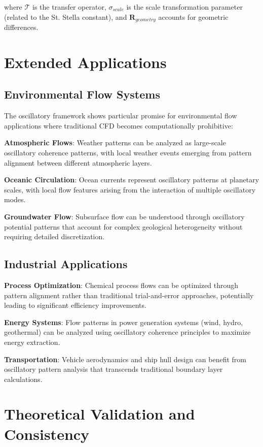 \documentclass[12pt,a4paper]{article}
\begin{document}
where $\mathcal{T}$ is the transfer operator, $\sigma_{scale}$ is the scale transformation parameter (related to the St. Stella constant), and $\mathbf{R}_{geometry}$ accounts for geometric differences.

\section{Extended Applications}

\subsection{Environmental Flow Systems}

The oscillatory framework shows particular promise for environmental flow applications where traditional CFD becomes computationally prohibitive:

\textbf{Atmospheric Flows}: Weather patterns can be analyzed as large-scale oscillatory coherence patterns, with local weather events emerging from pattern alignment between different atmospheric layers.

\textbf{Oceanic Circulation}: Ocean currents represent oscillatory patterns at planetary scales, with local flow features arising from the interaction of multiple oscillatory modes.

\textbf{Groundwater Flow}: Subsurface flow can be understood through oscillatory potential patterns that account for complex geological heterogeneity without requiring detailed discretization.

\subsection{Industrial Applications}

\textbf{Process Optimization}: Chemical process flows can be optimized through pattern alignment rather than traditional trial-and-error approaches, potentially leading to significant efficiency improvements.

\textbf{Energy Systems}: Flow patterns in power generation systems (wind, hydro, geothermal) can be analyzed using oscillatory coherence principles to maximize energy extraction.

\textbf{Transportation}: Vehicle aerodynamics and ship hull design can benefit from oscillatory pattern analysis that transcends traditional boundary layer calculations.

\section{Theoretical Validation and Consistency}
\end{document}
